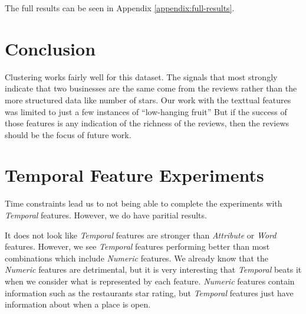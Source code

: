 \documentclass{article}
\begin{document}
The full results can be seen in Appendix \ref{appendix:full-results}.

\section{Conclusion}
Clustering works fairly well for this dataset.
The signals that most strongly indicate that two businesses are the same come from the reviews rather than the more structured data like number of stars.
Our work with the texttual features was limited to just a few instances of ``low-hanging fruit''
But if the success of those features is any indication of the richness of the reviews, then the reviews should be the focus of future work.

\appendix
\appendixpage

\section{Temporal Feature Experiments}
\label{appendix:temporal-features}

Time constraints lead us to not being able to complete the experiments with \textit{Temporal} features.
However, we do have paritial results.

It does not look like \textit{Temporal} features are stronger than \textit{Attribute} or \textit{Word} features.
However, we see \textit{Temporal} features performing better than most combinations which include \textit{Numeric} features.
We already know that the \textit{Numeric} features are detrimental, but it is very interesting that \textit{Temporal} beats it when we consider what is represented by each feature.
\textit{Numeric} features contain information such as the restaurants star rating, but \textit{Temporal} features just have information about when a place is open.
\end{document}

